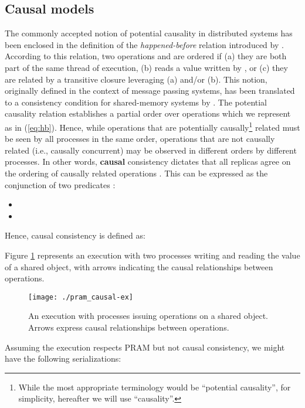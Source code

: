\documentclass[letter, 11pt]{article}
\newcommand{\citeN}{\citet}
\renewcommand{\cite}{\citep}
\begin{document}
\subsection{Causal models}
\label{subsec:causal}
The commonly accepted notion of potential causality in distributed systems 
has been enclosed in the definition of 
the \emph{happened-before} relation introduced by \citeN{Lamport:78}.
According to this relation, two operations  and  are ordered if 
(a) they are both part of the same thread of execution, (b)  reads a value written by , or
(c) they are related by a transitive closure leveraging (a) and/or (b).
This notion, originally defined in the context of message passing systems, 
has been translated to a consistency condition 
for shared-memory systems by \citeN{Hutto.Ahamad:90}.
The potential causality relation establishes a partial order over operations
which we represent as  in (\ref{eq:hb}).
Hence, while operations that are potentially causally\footnote{While the most appropriate terminology would 
be ``potential causality'', for simplicity, hereafter we will use ``causality''.}
related must be seen by all processes in the same order, operations that are 
not causally related (i.e., causally concurrent) may be observed in different orders by different processes. 
In other words, \textbf{causal} consistency  
dictates that all replicas agree on the ordering of causally related operations \cite{Hutto.Ahamad:90,Ahamad.Neiger.ea:95,P-Mahajan.Dahlin:11}.
This can be expressed as the conjunction of two predicates \cite{Burckhardt:14}:
\begin{itemize}
\item 
\item 
\end{itemize}
Hence, causal consistency is defined as:


Figure \ref{fig:pram_causal-ex} represents an execution with two processes writing and reading the value
of a shared object, with arrows indicating the causal relationships between operations.
\begin{figure}[h]
	\centering
	\texttt{[image: ./pram\_causal-ex]} 	\caption{An execution with processes issuing operations on a shared object.\\
	Arrows express causal relationships between operations.}
	\label{fig:pram_causal-ex}
\end{figure}

\noindent Assuming the execution respects PRAM but not causal consistency, we might have the following serializations:
\end{document}
